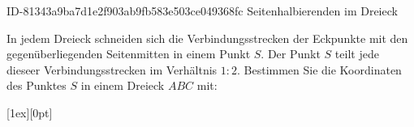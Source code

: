 \begin{exercise}
      {ID-81343a9ba7d1e2f903ab9fb583e503ce049368fc}
      {Seitenhalbierenden im Dreieck}
  \ifproblem\problem\par
    \begin{minipage}{23em}
      In jedem Dreieck schneiden sich die Verbindungsstrecken der Eckpunkte
      mit den gegenüberliegenden Seitenmitten in einem Punkt $S$. Der Punkt
      $S$ teilt jede dieseer Verbindungsstrecken im Verhältnis $1:2$. Bestimmen
      Sie die Koordinaten des Punktes $S$ in einem Dreieck $ABC$ mit:
    \end{minipage}%
    \hfill
    \raisebox{-1.5\baselineskip}[1ex][0pt]%
    {%
      \begin{minipage}{15em}%
        \centering
        \newcommand{\vnode}[5]%
        {%
          \begin{scope}%
            \coordinate (S1) at ($(#2)!1cm!0:(#3)$);
            \coordinate (S2) at ($(#2)!1cm!0:(#4)$);
            \coordinate (M)  at ($(S1)!0.5!0:(S2)$);
            \node at ($(#2)!#5!180:(M)$) {#1};
          \end{scope}%
        }%
      \end{minipage}%
    }\\
    \begin{minipage}[b]{23em}

\end{minipage}
\end{exercise}
